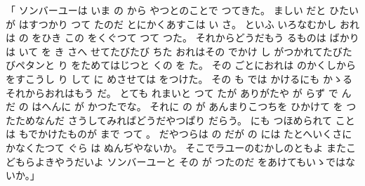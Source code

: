 \documentclass[a4paper,
tate,
book]
{jlreq}
\begin{document}
「  ソンバーユーは
いま の から
やつとのことで つてきた。
 ましい だと ひたいが
 はすつかり つて たのだ
とにかくあすこは い さ。
 といふ いろなむかし
おれは の をひき 
この をくぐつて  つて つた。
それからどうだもう るものは ばかり
 は いて を き
 さへ せてたびたび ちた
おれはその   でかけ し
 がつかれてたびたびペタンと り
 をためてはじつと くの を た。
その ごとにおれは のかくしから
 をすこうし り して
 に めさせては をつけた。
その も では 
 かけるにも かゝる
それからおれはもう だ。
とても れまいと つて たが
ありがたや が らず で んだ
 の はへんに が かつたでな。
それに の が
あんまりこつちを ひかけて
 を つたためなんだ
さうしてみればどうだやつぱり だらう。
 にも つほめられて ことは
 もでかけたものが
 まで つて 。
 だやつらは の だが
 の には
たとへいくさに かなくたつて
 ぐら は ぬんぢやないか。
そこでラユーのむかしのともよ
またこどもらよきやうだいよ
  ソンバーユーと
その が つたのだ
 をあけてもいゝではないか。」
 
\end{document}
